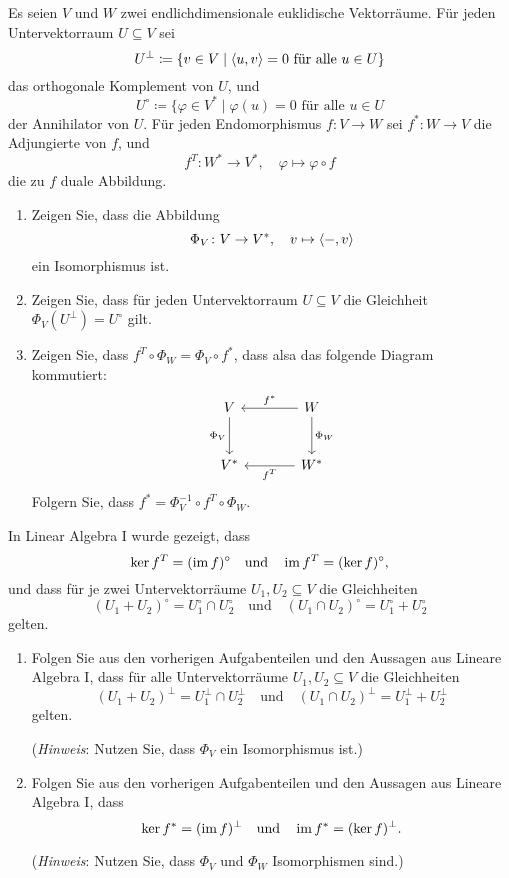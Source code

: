 \documentclass[a4paper,10pt]{scrartcl}
\begin{document}
\begin{question}
  Es seien $V$ und $W$ zwei endlichdimensionale euklidische Vektorräume.
  Für jeden Untervektorraum $U \subseteq V$ sei
  \[
              U^\perp
    \coloneqq \{ v \in V \mid \text{$\langle u, v \rangle = 0$ für alle $u \in U$} \}
  \]
  das orthogonale Komplement von $U$, und
  \[
              U^\circ
    \coloneqq \{ \varphi \in V^* \mid \text{$\varphi(u) = 0$ für alle $u \in U$}
  \]
  der Annihilator von $U$.
  Für jeden Endomorphismus $f \colon V \to W$ sei $f^* \colon W \to V$ die Adjungierte von $f$, und
  \[
    f^T \colon W^* \to V^*,
    \quad
    \varphi \mapsto \varphi \circ f
  \]
  die zu $f$ duale Abbildung.
  \begin{enumerate}
    \item
      Zeigen Sie, dass die Abbildung
      \[
        \Phi_V \colon V \to V^*,
        \quad
        v \mapsto \langle -, v \rangle
      \]
      ein Isomorphismus ist.
    \item
      Zeigen Sie, dass für jeden Untervektorraum $U \subseteq V$ die Gleichheit $\Phi_V(U^\perp) = U^\circ$ gilt.
    \item
      Zeigen Sie, dass $f^T \circ \Phi_W = \Phi_V \circ f^*$, dass alsa das folgende Diagram kommutiert:
      \[
        \begin{tikzcd}[row sep = large, column sep = large, ampersand replacement = \&]
                V   \arrow[swap]{d}{\Phi_V}
            \&  W   \arrow[swap]{l}{f^*}
                    \arrow{d}{\Phi_W}
          \\
                V^* 
            \&  W^* \arrow{l}{f^T}
        \end{tikzcd}
      \]
      Folgern Sie, dass $f^* = \Phi_V^{-1} \circ f^T \circ \Phi_W$.
  \end{enumerate}
  In Linear Algebra I wurde gezeigt, dass
  \[
      \ker f^T
    = (\operatorname{im} f)^\circ
    \quad\text{und}\quad
      \operatorname{im} f^T
    = (\ker f )^\circ,
  \]
  und dass für je zwei Untervektorräume $U_1, U_2 \subseteq V$ die Gleichheiten
  \[
      (U_1 + U_2)^\circ
    = U_1^\circ \cap U_2^\circ
    \quad\text{und}\quad
      (U_1 \cap U_2)^\circ
    = U_1^\circ + U_2^\circ
  \]
  gelten.
  \begin{enumerate}[resume]
    \item
      Folgen Sie aus den vorherigen Aufgabenteilen und den Aussagen aus Lineare Algebra I, dass für alle Untervektorräume $U_1, U_2 \subseteq V$ die Gleichheiten
      \[
          (U_1 + U_2)^\perp
        = U_1^\perp \cap U_2^\perp
        \quad\text{und}\quad
          (U_1 \cap U_2)^\perp
        = U_1^\perp + U_2^\perp
      \]
      gelten.
      
      (\emph{Hinweis}:
       Nutzen Sie, dass $\Phi_V$ ein Isomorphismus ist.)
    \item
      Folgen Sie aus den vorherigen Aufgabenteilen und den Aussagen aus Lineare Algebra I, dass
      \[
          \ker f^*
        = (\operatorname{im} f)^\perp
        \quad\text{und}\quad
          \operatorname{im} f^*
        = (\ker f)^\perp.
      \]
      
      (\emph{Hinweis}:
       Nutzen Sie, dass $\Phi_V$ und $\Phi_W$ Isomorphismen sind.)
  \end{enumerate}
\end{question}
\end{document}
